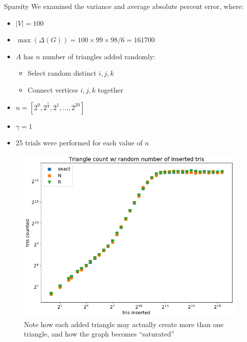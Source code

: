 \documentclass{beamer}
\begin{document}
\begin{frame}{Sparsity}
    We examined the variance and average absolute percent error, where:
    
    \begin{itemize}
        \item $|V| = 100$
        \item $\max(\Delta(G)) = 100 \times 99 \times 98 / 6 = 161700$
        \item $A$ has $n$ number of triangles added randomly:
        \begin{itemize}
            \item Select random distinct $i,j,k$
            \item Connect vertices $i,j,k$ together
        \end{itemize}
        \item $n = [2^0, 2^\frac{1}{2}, 2^1, \ldots, 2^{20}]$
        \item $\gamma = 1$
        \item 25 trials were performed for each value of $n$
    \end{itemize}
\end{frame}

\begin{frame}
    \begin{figure}
        \centering
        \includegraphics[width=0.7\linewidth]{figs/number-count.png}
        \caption{Note how each added triangle may actually create more than one triangle, and how the graph becomes ``saturated''}
        \label{fig:number-count}
    \end{figure}
\end{frame}
\end{document}
